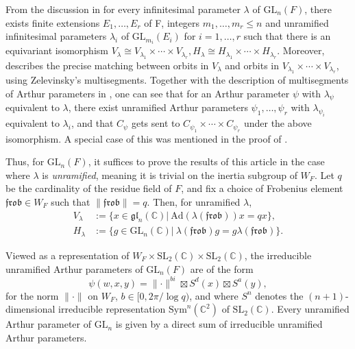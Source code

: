 \documentclass[12pt]{amsart}
\newcommand\norm[1]{\lVert#1\rVert}
\theoremstyle{plain}
\theoremstyle{definition}
\newcommand{\mf}{\mathfrak}
\newcommand{\bc}{\mathbb{C}}
\newcommand{\tx}{\text}
\newcommand{\Ad}{\mathrm{Ad}}
\newcommand{\1}{\mathbbm{1}}
\newcommand{\GL}{\mathrm{GL}}
\newcommand{\SL}{\mathrm{SL}}
\begin{document}
	From the discussion in \cite[Sections 3.4, 3.5]{Bal} for every infinitesimal parameter $\lambda$ of $\GL_n(F)$, there exists finite extensions $E_1, \ldots, E_r$ of F, integers $m_1, \ldots, m_r\leq n$ and unramified infinitesimal parameters $\lambda_i$ of $\GL_{m_i}(E_i)$ for $i=1, \ldots, r$ such that there is an equivariant isomorphism $V_{\lambda}\cong V_{\lambda_1}\times\cdots \times V_{\lambda_r}, H_{\lambda}\cong H_{\lambda_1}\times\cdots \times H_{\lambda_r}$.  
	Moreover, \cite{Bal} describes the precise matching between orbits in $V_{\lambda}$ and orbits in $ V_{\lambda_1}\times\cdots \times V_{\lambda_r}$,  using Zelevinsky's multisegments.  
	Together with the description of multisegments of Arthur parameters in \cite{CR24}, one can see that for an Arthur parameter $\psi$ with $\lambda_\psi$ equivalent to $\lambda$, there exist unramified Arthur parameters $\psi_1, \ldots, \psi_r$ with $\lambda_{\psi_i}$ equivalent to $\lambda_i$, and that $C_\psi$ gets sent to $C_{\psi_1}\times\cdots \times C_{\psi_r}$ under the above isomorphism.  
	A special case of this was mentioned in the proof of \cite[Theorem 6.4]{CR24}.  
	
	
	Thus, for $\GL_n(F)$, it suffices to prove the results of this article in the case where $\lambda$ is \emph{unramified}, meaning it is trivial on the inertia subgroup of $W_F$.  
	Let $q$ be the cardinality of the residue field of $F$, and fix a choice of Frobenius element $\mf{frob}\in W_F$ such that $\norm{\mf{frob}}=q$.  
	Then, for unramified $\lambda$,
	 \begin{align*}
	 	V_\lambda&:=\{x\in \mf{gl}_n(\bc) | \  \Ad(\lambda(\mf{frob}))x=qx\},\\
	 	H_\lambda&:=\{g\in \GL_n(\bc) | \ \lambda(\mf{frob})g=g\lambda(\mf{frob})\}.
	 \end{align*}
		
	Viewed as a representation of $W_F\times \SL_2(\bc)\times\SL_2(\bc)$, the irreducible unramified Arthur parameters of $\GL_n(F)$ are of the form
	$$\psi(w, x, y)=\norm{\cdot}^{bi}\boxtimes S^d(x)\boxtimes S^a(y),$$
	for the norm $\norm{\cdot}$ on $W_F$, $b\in [0, 2\pi/\log q )$, and where $S^n$ denotes the $(n+1)$-dimensional irreducible representation $\tx{Sym}^n(\bc^2)$ of $\SL_2(\bc)$.  
	Every unramified Arthur parameter of $\GL_n$ is given by a direct sum of irreducible unramified Arthur parameters. 

	
\end{document}
